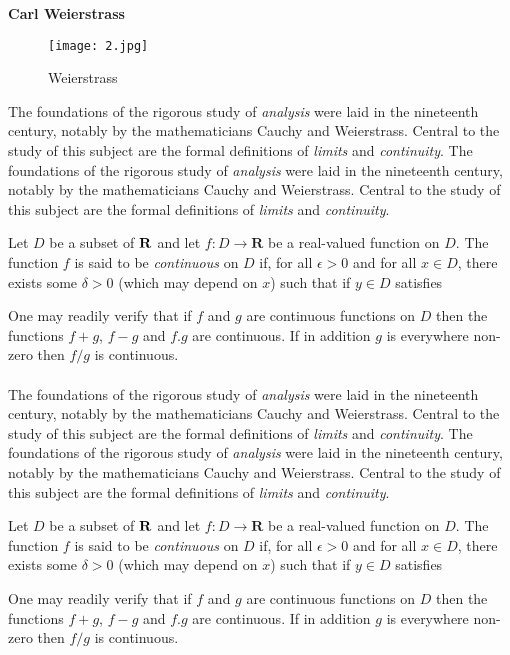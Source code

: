 \documentclass[12pt]{article}
\begin{document}
\textcolor[rgb]{0.00,0.00,1}{\textbf{Carl Weierstrass}}
\\
\begin{wrapfigure}{l}{0.3\textwidth}
		\texttt{[image: 2.jpg]}
		\caption{Weierstrass}\label{fig:1}	
\end{wrapfigure}

The foundations of the rigorous study of \emph{analysis}
were laid in the nineteenth century, notably by the
mathematicians Cauchy and Weierstrass. Central to the
study of this subject are the formal definitions of
\emph{limits} and \emph{continuity}.
The foundations of the rigorous study of \emph{analysis}
were laid in the nineteenth century, notably by the
mathematicians Cauchy and Weierstrass. Central to the
study of this subject are the formal definitions of
\emph{limits} and \emph{continuity}.

Let $D$ be a subset of $\bf R$ and let
$f \colon D \to \mathbf{R}$ be a real-valued function on
$D$. The function $f$ is said to be \emph{continuous} on
$D$ if, for all $\epsilon > 0$ and for all $x \in D$,
there exists some $\delta > 0$ (which may depend on $x$)
such that if $y \in D$ satisfies

One may readily verify that if $f$ and $g$ are continuous
functions on $D$ then the functions $f+g$, $f-g$ and
$f.g$ are continuous. If in addition $g$ is everywhere
non-zero then $f/g$ is continuous.
\\
\\
The foundations of the rigorous study of \emph{analysis}
were laid in the nineteenth century, notably by the
mathematicians Cauchy and Weierstrass. Central to the
study of this subject are the formal definitions of
\emph{limits} and \emph{continuity}.
The foundations of the rigorous study of \emph{analysis}
were laid in the nineteenth century, notably by the
mathematicians Cauchy and Weierstrass. Central to the
study of this subject are the formal definitions of
\emph{limits} and \emph{continuity}.

Let $D$ be a subset of $\bf R$ and let
$f \colon D \to \mathbf{R}$ be a real-valued function on
$D$. The function $f$ is said to be \emph{continuous} on
$D$ if, for all $\epsilon > 0$ and for all $x \in D$,
there exists some $\delta > 0$ (which may depend on $x$)
such that if $y \in D$ satisfies

One may readily verify that if $f$ and $g$ are continuous
functions on $D$ then the functions $f+g$, $f-g$ and
$f.g$ are continuous. If in addition $g$ is everywhere
non-zero then $f/g$ is continuous.
\end{document}
